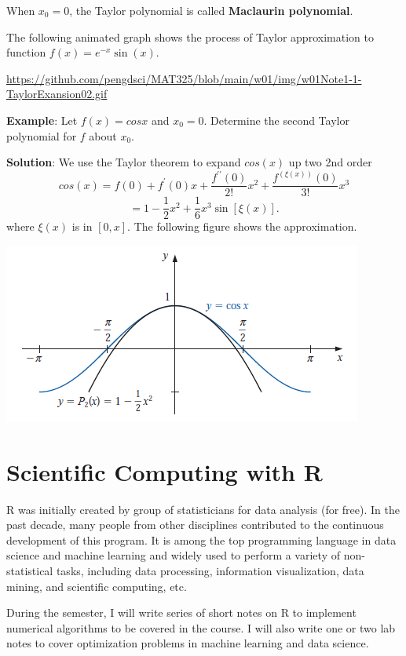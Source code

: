 \documentclass[
]{book}
\begin{document}
When \(x_0 = 0\), the Taylor polynomial is called \textbf{Maclaurin polynomial}.

The following animated graph shows the process of Taylor approximation to function \(f(x) =e^{-x}\sin(x)\).

\url{https://github.com/pengdsci/MAT325/blob/main/w01/img/w01Note1-1-TaylorExansion02.gif}

\hfill\break

\textbf{Example}: Let \(f (x) = cos x\) and \(x_0 = 0\). Determine the second Taylor polynomial for \(f\) about \(x_0\).

\textbf{Solution}: We use the Taylor theorem to expand \(cos(x)\) up two 2nd order
\[
cos(x) = f(0) + f^\prime(0)x+\frac{f^{\prime\prime}(0)}{2!}x^2+\frac{f^{(\xi(x))}(0)}{3!}x^3
\]
\[
=1 - \frac{1}{2}x^2+\frac{1}{6}x^3\sin[\xi(x)].
\]
where \(\xi(x)\) is in \([0, x]\). The following figure shows the approximation.

\begin{center}\includegraphics[width=0.75\linewidth]{img01/w01-MacclaurinExpansion} \end{center}

\hypertarget{scientific-computing-with-r}{%
\chapter{Scientific Computing with R}\label{scientific-computing-with-r}}

R was initially created by group of statisticians for data analysis (for free). In the past decade, many people from other disciplines contributed to the continuous development of this program. It is among the top programming language in data science and machine learning and widely used to perform a variety of non-statistical tasks, including data processing, information visualization, data mining, and scientific computing, etc.

During the semester, I will write series of short notes on R to implement numerical algorithms to be covered in the course. I will also write one or two lab notes to cover optimization problems in machine learning and data science.
\end{document}
